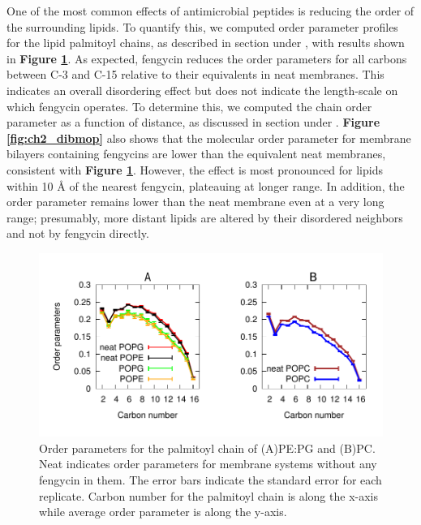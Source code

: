 One of the most common effects of antimicrobial peptides is reducing the order
of the surrounding lipids.\cite{Seelig2004} To quantify this, we computed order parameter
profiles for the lipid palmitoyl chains, as described in section \textbf{
} under \textbf{}, with results shown in \textbf{Figure \ref{fig:ch2_ord_par}}.  As expected,
fengycin reduces the order parameters for all carbons between C-3 and C-15 relative
to their equivalents in neat membranes. This indicates an overall disordering effect
but does not indicate the length-scale on which fengycin operates.
To determine this, we computed the chain order parameter as a function of
distance, as discussed in section \textbf{} under \textbf{}.
 \textbf{Figure \ref{fig:ch2_dibmop}} also shows that the molecular order parameter for membrane bilayers containing
fengycins are lower than the equivalent neat membranes, consistent with \textbf{Figure
\ref{fig:ch2_ord_par}}.  However, the effect is most pronounced for lipids within 10
{\AA} of the nearest fengycin, plateauing at longer range. In addition, the order
parameter remains lower than the neat membrane even at a very long range;
presumably, more distant lipids are altered by their disordered neighbors and
not by fengycin directly.

\begin{figure}
\centering
\includegraphics[width=1.0\textwidth]{chapter2_figs/ord_par_corr.pdf}
\caption{\label{fig:ch2_ord_par} Order parameters for the palmitoyl chain of
(A)PE:PG and (B)PC. Neat indicates order parameters for membrane systems without
any fengycin in them. The error bars indicate the standard error for each
replicate. Carbon number for the palmitoyl chain is along the x-axis while
average order parameter is along the y-axis.}
\end{figure}

